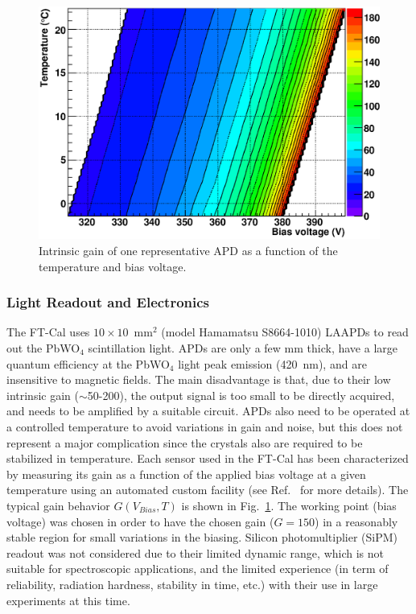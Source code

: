 \begin{figure}[th!]
\centering 
\includegraphics[width=1.0\columnwidth]{./fig/apd5.eps} 
\caption{Intrinsic gain of one representative APD as a function of the temperature and bias voltage.}
\label{fig:G-V-T} 
\end{figure}

\subsubsection{Light Readout and Electronics}
\label{sec:ftcalread}

The FT-Cal uses $10 \times 10$~mm$^2$ (model Hamamatsu S8664-1010) LAAPDs to read out the PbWO$_4$
scintillation light. APDs are only a few mm thick, have a large quantum efficiency at the PbWO$_4$ light peak
emission (420~nm), and  are insensitive to magnetic fields. The main disadvantage is that, due to their low intrinsic
gain ($\sim$50-200), the output signal is too small to be directly acquired, and needs to be amplified by a suitable
circuit. APDs also need to be operated at a controlled temperature to avoid variations in gain and noise, but this
does not represent a major complication since the crystals also are required to be stabilized in temperature. Each
sensor used in the FT-Cal has been characterized by measuring its gain as a function of the applied bias voltage at
a given temperature using an automated  custom facility (see Ref.~\cite{celeAPD} for more details). The typical
gain behavior $G(V_{Bias},T)$ is shown in Fig.~\ref{fig:G-V-T}. The working point (bias voltage) was chosen in order
to have the chosen gain ($G=150$) in a reasonably stable region for small variations in the biasing. Silicon
photomultiplier (SiPM) readout was not considered due to their limited dynamic range, which is not suitable for
spectroscopic applications, and the limited experience (in term of reliability, radiation hardness, stability in time,
etc.) with their use in large experiments at this time.

